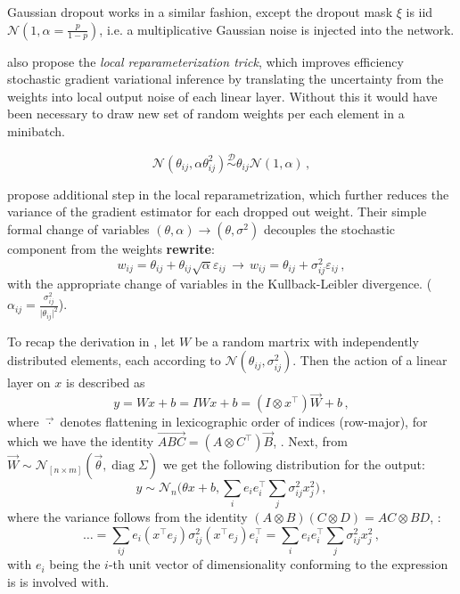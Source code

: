 \documentclass[a4paper,10pt]{article}
\newcommand{\important}[1]{\textbf{\color{red} #1}}
\newcommand{\rewrite}{\important{rewrite}}
\renewcommand{\vec}{\overrightarrow}
\begin{document}
Gaussian dropout works in a similar fashion, except the dropout mask $\xi$ is iid
$\mathcal{N}(1, \alpha=\tfrac{p}{1-p})$, i.e. a multiplicative Gaussian noise is
injected into the network.


\cite{kingma_variational_2015} also propose the \textit{local reparameterization trick},
which improves efficiency stochastic gradient variational inference by translating
the uncertainty from the weights into local output noise of each linear layer. Without
this it would have been necessary to draw new set of random weights per each element
in a minibatch.

$$
  \mathcal{N}(\theta_{ij}, \alpha \theta^2_{ij})
  \overset{\mathcal{D}}{\sim}
  \theta_{ij} \mathcal{N}(1, \alpha)
  \,, $$

\cite{molchanov_variational_2017} propose additional step in the local reparametrization,
which further reduces the variance of the gradient estimator for each dropped out
weight. Their simple formal change of variables $(\theta, \alpha) \to (\theta, \sigma^2)$
decouples the stochastic component from the weights \rewrite:
$$
  w_{ij} = \theta_{ij} + \theta_{ij} \sqrt{\alpha} \varepsilon_{ij}
  \,\to\,
  w_{ij} = \theta_{ij} + \sigma^2_{ij} \varepsilon_{ij}
  \,, $$
with the appropriate change of variables in the Kullback-Leibler divergence.
($\alpha_{ij} = \tfrac{\sigma_{ij}^2}{\lvert \theta_{ij}\rvert^2}$).

To recap the derivation in \cite{kingma_variational_2015}, let $W$ be a random martrix
with independently distributed elements, each according to $\mathcal{N}(\theta_{ij}, \sigma^2_{ij})$.
Then the action of a linear layer on $x$ is described as 
$$
  y = W x + b = I W x + b
    = (I \otimes x^\top) \vec{W} + b
  \,, $$
where $\vec{\cdot}$ denotes flattening in lexicographic order of indices (row-major),
for which we have the identity $\vec{A B C} = (A \otimes C^\top) \vec{B}$, \cite{cookbook2012}.
Next, from $\vec{W}\sim \mathcal{N}_{[n\times m]}(\vec{\theta}, \mathop{diag}\Sigma)$
we get the following distribution for the output:
$$
  y \sim \mathcal{N}_{n}
    \bigl(
      \theta x + b,
      \sum_{i} e_i e_i^\top \sum_j \sigma^2_{ij} x_j^2
    \bigr)
  \,, $$
where the variance follows from the identity $(A\otimes B)(C\otimes D) = AC\otimes BD$,
\cite{cookbook2012}:
$$
  \ldots
    = \sum_{ij} e_i (x^\top e_j) \sigma^2_{ij} (x^\top e_j) e_i^\top
    = \sum_{i} e_i e_i^\top \sum_j \sigma^2_{ij} x_j^2
  \,, $$
with $e_i$ being the $i$-th unit vector of dimensionality conforming to the expression
is is involved with.
\end{document}
